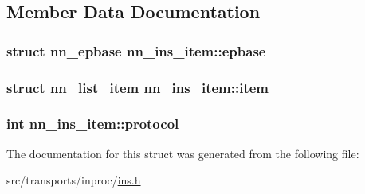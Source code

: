 \subsection{Member Data Documentation}
\subsubsection[{epbase}]{\setlength{\rightskip}{0pt plus 5cm}struct {\bf nn\+\_\+epbase} nn\+\_\+ins\+\_\+item\+::epbase}\hypertarget{structnn__ins__item_a15a0b556b4f83f7e6e56100240ba447e}{}\label{structnn__ins__item_a15a0b556b4f83f7e6e56100240ba447e}
\subsubsection[{item}]{\setlength{\rightskip}{0pt plus 5cm}struct {\bf nn\+\_\+list\+\_\+item} nn\+\_\+ins\+\_\+item\+::item}\hypertarget{structnn__ins__item_a4bd16a4e13b6fdf31dd4676765c546ef}{}\label{structnn__ins__item_a4bd16a4e13b6fdf31dd4676765c546ef}
\subsubsection[{protocol}]{\setlength{\rightskip}{0pt plus 5cm}int nn\+\_\+ins\+\_\+item\+::protocol}\hypertarget{structnn__ins__item_a4b7d1b078f05bf6940b8df04dbf50483}{}\label{structnn__ins__item_a4b7d1b078f05bf6940b8df04dbf50483}


The documentation for this struct was generated from the following file\+:\begin{DoxyCompactItemize}
\item 
src/transports/inproc/\hyperlink{ins_8h}{ins.\+h}\end{DoxyCompactItemize}
